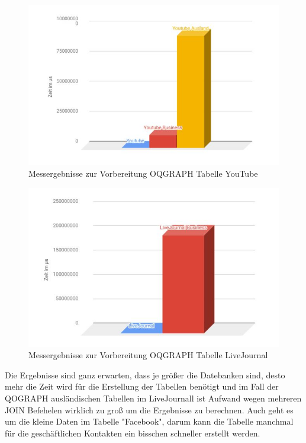 \begin{figure}
	\centering
	\includegraphics[width=\textwidth]{images/youtubvor.jpg}
	\caption{Messergebnisse zur Vorbereitung OQGRAPH Tabelle YouTube}
	\label{fig:youtubvor}
\end{figure}

\begin{figure}
	\centering
	\includegraphics[width=\textwidth]{images/LiJouvor.jpg}
	\caption{Messergebnisse zur Vorbereitung OQGRAPH Tabelle LiveJournal}
	\label{fig:LiJouvor}
\end{figure}

Die Ergebnisse sind ganz erwarten, dass je größer die Datebanken sind, desto mehr die Zeit wird für die Erstellung der Tabellen benötigt und im Fall der QOGRAPH ausländischen Tabellen im LiveJournall ist Aufwand wegen mehreren JOIN Befehelen wirklich zu groß um die Ergebnisse zu berechnen.
Auch geht es um die kleine Daten im Tabelle "Facebook", darum kann die Tabelle manchmal  für die geschäftlichen Kontakten ein bisschen schneller erstellt werden.  


